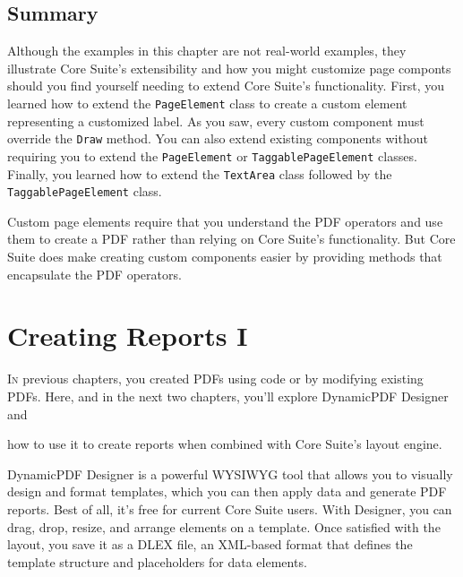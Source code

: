 \documentclass[american,letterpaper]{tufte-book}
\numberwithin{equation}{section}
\numberwithin{figure}{section}
\def\color#1{}%
\begin{document}
{{\begin{figure}
\end{figure}
\section{Summary}
Although the examples in this chapter are not real-world examples, they illustrate Core Suite's extensibility and how you might customize page componts should you find yourself needing to extend Core Suite's functionality. First, you learned how to extend the \texttt{PageElement} class to create a custom element representing a customized label. As you saw, every custom component must override the \texttt{Draw} method. You can also extend existing components without requiring you to extend the \texttt{PageElement} or \texttt{TaggablePageElement} classes.  Finally, you learned how to extend the \texttt{TextArea} class followed by the \texttt{TaggablePageElement} class.

Custom page elements require that you understand the PDF operators and use them to create a PDF rather than relying on Core Suite's functionality. But Core Suite does make creating custom components easier by providing methods that encapsulate the PDF operators. 

\color{white}
\chapter{Creating Reports I}\label{chap:report-layout-data}
\color{black}
\BgThispage
\vspace{8.00em}
\lettrine[lines=2,lhang=0.1]{I}{n} previous chapters, you created PDFs using code or by modifying existing
PDFs. Here, and in the next two chapters, you'll explore DynamicPDF Designer
and

 how to use it to create reports when combined with Core Suite's layout engine. 

DynamicPDF Designer is a powerful WYSIWYG tool that allows you to
visually design and format templates, which you can then apply data and generate PDF reports. Best of all, it's free for current
Core Suite users. With Designer, you can drag, drop, resize, and arrange
elements on a template. Once satisfied with the layout, you save it
as a DLEX file, an XML-based format that defines the template structure
and placeholders for data elements.

}}
\end{document}
